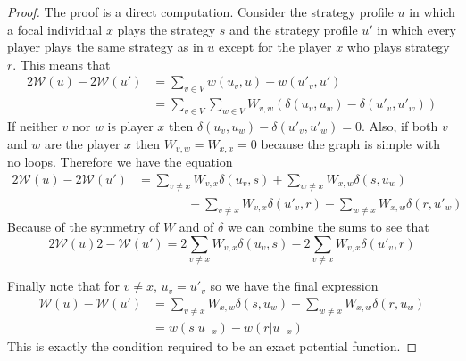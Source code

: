 \documentclass[10pt,a4paper]{amsart}
\begin{document}
\begin{proof}
    The proof is a direct computation. Consider the strategy profile $u$ in which a focal individual $x$ plays the strategy $s$ and the strategy profile $u'$ in which every player plays the same strategy as in $u$ except for the player $x$ who plays strategy $r$. This means that 
    \begin{equation*}
        \begin{split}
            2\mathcal{W}(u)-2\mathcal{W}(u')&=\sum_{v\in V}w(u_v,u)-w(u'_v,u')\\
            &=\sum_{v\in V}\sum_{w\in V}W_{v,w}(\delta(u_v,u_w)-\delta(u'_v,u'_w))
        \end{split}
    \end{equation*}
    If neither $v$ nor $w$ is player $x$ then $\delta(u_v,u_w)-\delta(u'_v,u'_w)=0$. Also, if both $v$ and $w$ are the player $x$ then $W_{v,w}=W_{x,x}=0$ because the graph is simple with no loops. Therefore we have the equation
    \begin{equation*}
        \begin{split}
            2\mathcal{W}(u)-2\mathcal{W}(u')&=\sum_{v\neq x}W_{v,x}\delta(u_v,s)+\sum_{w\neq x} W_{x,w}\delta (s,u_w)\\
            &\quad\quad\quad\quad-\sum_{v\neq x}W_{v,x}\delta(u'_v,r)-\sum_{w\neq x} W_{x,w}\delta (r,u'_w)
        \end{split}
    \end{equation*}
    Because of the symmetry of $W$ and of $\delta$ we can combine the sums to see that 
    \[2\mathcal{W}(u)2-\mathcal{W}(u')=2\sum_{v\neq x}W_{v,x}\delta(u_v,s)-2\sum_{v\neq x}W_{v,x}\delta(u'_v,r)\]

    Finally note that for $v\neq x$, $u_v=u'_v$ so we have the final expression
    \begin{equation*}
        \begin{split}\mathcal{W}(u)-\mathcal{W}(u')&=\sum_{v\neq x}W_{x,w}\delta(s,u_w)-\sum_{w\neq x} W_{x,w}\delta (r,u_w)\\
        &= w(s|u_{-x})-w(r|u_{-x})
        \end{split}
    \end{equation*}
    This is exactly the condition required to be an exact potential function. 
\end{proof}
\end{document}
